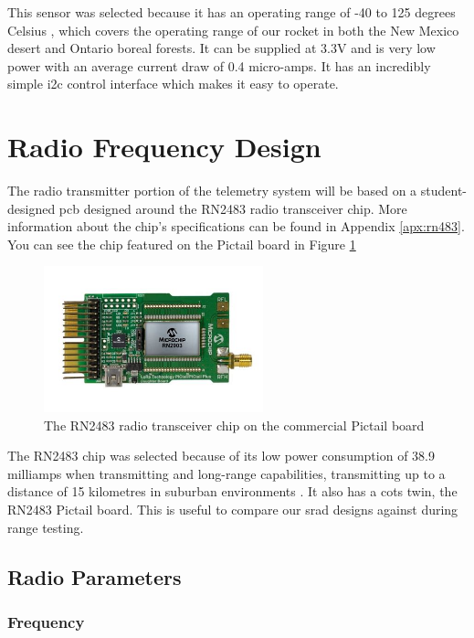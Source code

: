 This sensor was selected because it has an operating range of -40 to 125 degrees Celsius \cite[1]{sht4x-datasheet},
which covers the operating range of our rocket in both the New Mexico desert and Ontario boreal forests. It can be
supplied at 3.3V \cite[1]{sht4x-datasheet} and is very low power with an average current draw of 0.4 micro-amps.
\cite[1]{sht4x-datasheet} It has an incredibly simple \gls{i2c} control interface which makes it easy to operate.
\cite[Sec. 4.5]{sht4x-datasheet}

\section{Radio Frequency Design}

The radio transmitter portion of the telemetry system will be based on a student-designed \gls{pcb} designed around the
RN2483 radio transceiver chip. More information about the chip's specifications can be found in Appendix
\ref{apx:rn483}. You can see the chip featured on the Pictail board in Figure \ref{fig:pictail}

\begin{figure}[H]
    \centering
    \includegraphics[width=2.5in]{assets/images/pictail.jpg}
    \caption{The RN2483 radio transceiver chip on the commercial Pictail board \cite{pictail-img}}
    \label{fig:pictail}
\end{figure}

The RN2483 chip was selected because of its low power consumption of 38.9 milliamps when transmitting \cite[Table
    2-3]{rn2483-datasheet} and long-range capabilities, transmitting up to a distance of 15 kilometres in suburban
environments \cite[1]{rn2483-datasheet}. It also has a \gls{cots} twin, the RN2483 Pictail board. This is useful to
compare our \gls{srad} designs against during range testing.

\subsection{Radio Parameters}

\subsubsection{Frequency}

